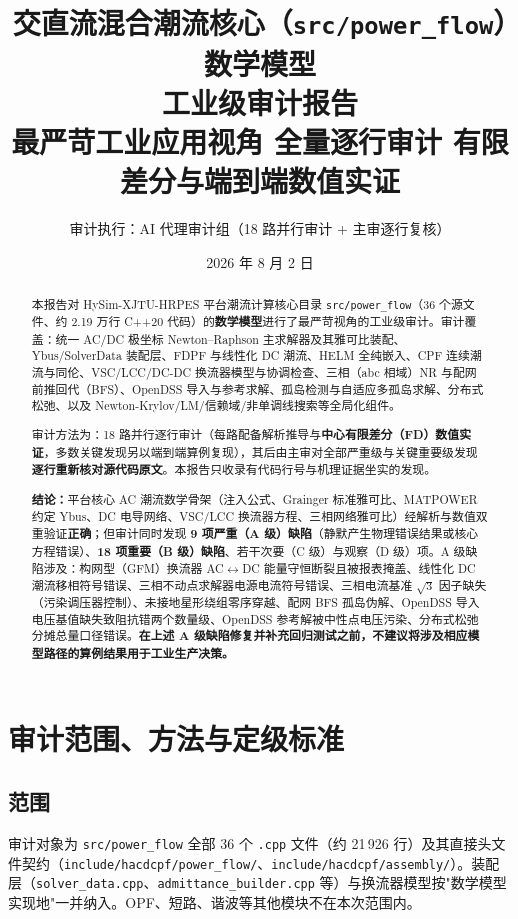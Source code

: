 \documentclass[11pt,a4paper,fontset=fandol]{ctexart}
\title{\textbf{交直流混合潮流核心（\texttt{src/power\_flow}）数学模型\\工业级审计报告}\\[0.5em]
\large 最严苛工业应用视角 \textbar{} 全量逐行审计 \textbar{} 有限差分与端到端数值实证}
\author{审计执行：AI 代理审计组（18 路并行审计 + 主审逐行复核）}
\date{2026 年 8 月 2 日}
\newcommand{\file}[1]{\texttt{#1}}
\begin{document}
\maketitle

\begin{abstract}
\noindent
本报告对 HySim-XJTU-HRPES 平台潮流计算核心目录 \file{src/power\_flow}（36 个源文件、约 2.19 万行 C++20 代码）的\textbf{数学模型}进行了最严苛视角的工业级审计。审计覆盖：统一 AC/DC 极坐标 Newton--Raphson 主求解器及其雅可比装配、Ybus/SolverData 装配层、FDPF 与线性化 DC 潮流、HELM 全纯嵌入、CPF 连续潮流与同伦、VSC/LCC/DC-DC 换流器模型与协调检查、三相（abc 相域）NR 与配网前推回代（BFS）、OpenDSS 导入与参考求解、孤岛检测与自适应多孤岛求解、分布式松弛、以及 Newton-Krylov/LM/信赖域/非单调线搜索等全局化组件。

审计方法为：18 路并行逐行审计（每路配备解析推导与\textbf{中心有限差分（FD）数值实证}，多数关键发现另以端到端算例复现），其后由主审对全部严重级与关键重要级发现\textbf{逐行重新核对源代码原文}。本报告只收录有代码行号与机理证据坐实的发现。

\textbf{结论：}平台核心 AC 潮流数学骨架（注入公式、Grainger 标准雅可比、MATPOWER 约定 Ybus、DC 电导网络、VSC/LCC 换流器方程、三相网络雅可比）经解析与数值双重验证\textbf{正确}；但审计同时发现 \textbf{9 项严重（A 级）缺陷}（静默产生物理错误结果或核心方程错误）、\textbf{18 项重要（B 级）缺陷}、若干次要（C 级）与观察（D 级）项。A 级缺陷涉及：构网型（GFM）换流器 AC$\leftrightarrow$DC 能量守恒断裂且被报表掩盖、线性化 DC 潮流移相符号错误、三相不动点求解器电源电流符号错误、三相电流基准 $\sqrt{3}$ 因子缺失（污染调压器控制）、未接地星形绕组零序穿越、配网 BFS 孤岛伪解、OpenDSS 导入电压基值缺失致阻抗错两个数量级、OpenDSS 参考解被中性点电压污染、分布式松弛分摊总量口径错误。\textbf{在上述 A 级缺陷修复并补充回归测试之前，不建议将涉及相应模型路径的算例结果用于工业生产决策。}
\end{abstract}

\tableofcontents
\newpage

\section{审计范围、方法与定级标准}

\subsection{范围}

审计对象为 \file{src/power\_flow} 全部 36 个 \file{.cpp} 文件（约 21\,926 行）及其直接头文件契约（\file{include/hacdcpf/power\_flow/}、\file{include/hacdcpf/assembly/}）。装配层（\file{solver\_data.cpp}、\file{admittance\_builder.cpp} 等）与换流器模型按"数学模型实现地"一并纳入。OPF、短路、谐波等其他模块不在本次范围内。
\end{document}
